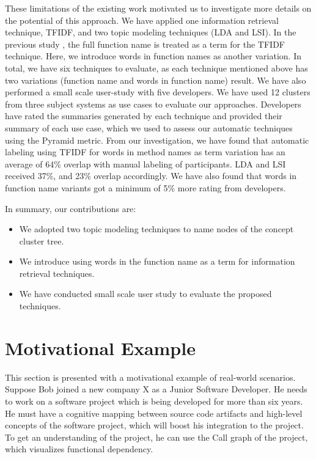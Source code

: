 These limitations of the existing work motivated us to investigate more details on the potential of this approach. We have applied one information retrieval technique, TFIDF, and two topic modeling techniques (LDA and LSI). In the previous study \cite{gharibi2018automatic}, the full function name is treated as a term for the TFIDF technique. Here, we introduce words in function names as another variation. In total, we have six techniques to evaluate, as each technique mentioned above has two variations (function name and words in function name) result. We have also performed a small scale user-study with five developers. We have used 12 clusters from three subject systems as use cases to evaluate our approaches. Developers have rated the summaries generated by each technique and provided their summary of each use case, which we used to assess our automatic techniques using the Pyramid metric. From our investigation, we have found that automatic labeling using TFIDF for words in method names as term variation has an average of 64\% overlap with manual labeling of participants. LDA and LSI received 37\%, and 23\% overlap accordingly. We have also found that words in function name variants got a minimum of 5\% more rating from developers.

In summary, our contributions are:
\begin{itemize}
  \item We adopted two topic modeling techniques to name nodes of the concept cluster tree. 
  \item We introduce using words in the function name as a term for information retrieval techniques.
  \item We have conducted small scale user study to evaluate the proposed techniques.
\end{itemize}



\section{Motivational Example}
\label{motive}

This section is presented with a motivational example of real-world scenarios. Suppose Bob joined a new company X as a Junior Software Developer. He needs to work on a software project which is being developed for more than six years. He must have a cognitive mapping between source code artifacts and high-level concepts of the software project, which will boost his integration to the project. To get an understanding of the project, he can use the Call graph of the project, which visualizes functional dependency.

